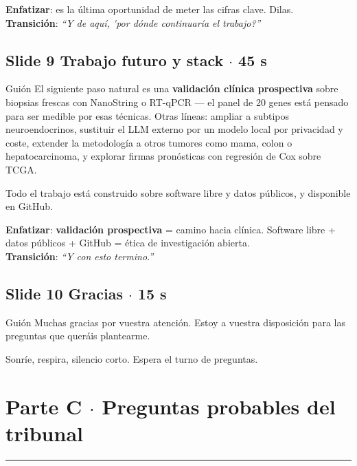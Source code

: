 \documentclass[11pt, a4paper]{article}
\newcommand{\slidebadge}[1]{{\colorbox{verdeTerm}{\color{white}\bfseries\;#1\;}}}
\begin{document}
\textbf{Enfatizar}: es la \'ultima oportunidad de meter las cifras clave. Dilas.\\
\textbf{Transici\'on}: \emph{``Y de aqu\'i, \'{}por d\'onde continuar\'ia el trabajo?''}

\subsection*{\slidebadge{Slide 9} Trabajo futuro y stack $\cdot$ 45 s}

\begin{guioncaja}{Gui\'on}
El siguiente paso natural es una \textbf{validaci\'on cl\'inica prospectiva} sobre biopsias frescas con NanoString o RT-qPCR --- el panel de 20 genes est\'a pensado para ser medible por esas t\'ecnicas. Otras l\'ineas: ampliar a subtipos neuroendocrinos, sustituir el LLM externo por un modelo local por privacidad y coste, extender la metodolog\'ia a otros tumores como mama, colon o hepatocarcinoma, y explorar firmas pron\'osticas con regresi\'on de Cox sobre TCGA.

Todo el trabajo est\'a construido sobre software libre y datos p\'ublicos, y disponible en GitHub.
\end{guioncaja}

\textbf{Enfatizar}: \textbf{validaci\'on prospectiva} = camino hacia cl\'inica. Software libre + datos p\'ublicos + GitHub = \'etica de investigaci\'on abierta.\\
\textbf{Transici\'on}: \emph{``Y con esto termino.''}

\subsection*{\slidebadge{Slide 10} Gracias $\cdot$ 15 s}

\begin{guioncaja}{Gui\'on}
Muchas gracias por vuestra atenci\'on. Estoy a vuestra disposici\'on para las preguntas que quer\'ais plantearme.
\end{guioncaja}

Sonr\'ie, respira, silencio corto. Espera el turno de preguntas.

\newpage

\section*{Parte C $\cdot$ Preguntas probables del tribunal}
{\color{verdeTerm}\rule{2.5cm}{2pt}}
\end{document}
